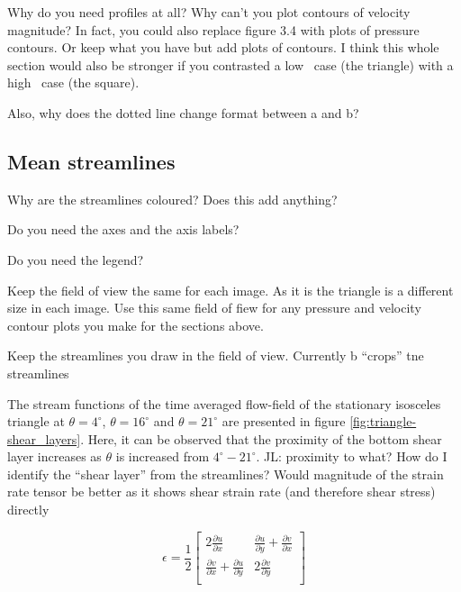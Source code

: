 Why do you need profiles at all? Why can't you plot contours of velocity magnitude? In fact, you could also replace figure 3.4 with plots of pressure contours. Or keep what you have but add plots of contours. I think this whole section would also be stronger if you contrasted a low \ratio\ case (the triangle) with a high \ratio\ case (the square).

Also, why does the dotted line change format between a and b?


\subsection{Mean streamlines}



Why are the streamlines coloured? Does this add anything?

Do you need the axes and the axis labels?

Do you need the legend?

Keep the field of view the same for each image. As it is the triangle
is a different size in each image. Use this same field of fiew for any pressure and velocity contour plots you make for the sections above.

Keep the streamlines you draw in the field of view. Currently b ``crops'' tne streamlines

The stream functions of the time averaged flow-field of the stationary isosceles triangle at  $\theta=4^{\circ}$, $\theta=16^{\circ}$ and $\theta=21^{\circ}$ are presented in figure \ref{fig:triangle-shear_layers}. Here, it can be observed that the proximity of the bottom shear layer increases as $\theta$ is increased from $4^{\circ}-21^{\circ}$. JL: proximity to what? How do I identify the ``shear layer'' from the streamlines? Would magnitude of the strain rate tensor be better as it shows shear strain rate (and therefore shear stress) directly

\begin{equation}
\epsilon = \frac{1}{2}
\begin{bmatrix}
  2\frac{\partial u}{\partial x} & \frac{\partial u}{\partial y} + \frac{\partial v}{\partial x} \\
  \frac{\partial v}{\partial x} + \frac{\partial u}{\partial y} & 2\frac{\partial v}{\partial y} \\
\end{bmatrix}
\end{equation}

